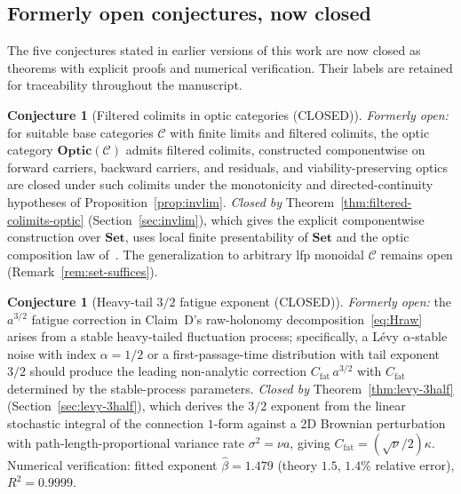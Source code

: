\documentclass[11pt,a4paper]{article}
\theoremstyle{plain}
\theoremstyle{definition}
\newtheorem{conjecture}[theorem]{Conjecture}
\theoremstyle{remark}
\newcommand{\CC}{\mathcal{C}}
\newcommand{\Optic}{\mathbf{Optic}}
\begin{document}
\subsection{Formerly open conjectures, now closed}

The five conjectures stated in earlier versions of this work are now
closed as theorems with explicit proofs and numerical verification.
Their labels are retained for traceability throughout the manuscript.

\begin{conjecture}[Filtered colimits in optic categories (CLOSED)]
\label{conj:filtered-colimits-optic}
\emph{Formerly open:} for suitable base categories $\CC$ with finite
limits and filtered colimits, the optic category $\Optic(\CC)$ admits
filtered colimits, constructed componentwise on forward carriers,
backward carriers, and residuals, and viability-preserving optics are
closed under such colimits under the monotonicity and directed-continuity
hypotheses of Proposition~\ref{prop:invlim}. \emph{Closed by}
Theorem~\ref{thm:filtered-colimits-optic} (Section~\ref{sec:invlim}),
which gives the explicit componentwise construction over $\mathbf{Set}$,
uses local finite presentability of $\mathbf{Set}$ and the optic
composition law of~\cite{riley2018optics}. The generalization to
arbitrary lfp monoidal $\CC$ remains open
(Remark~\ref{rem:set-suffices}).
\end{conjecture}

\begin{conjecture}[Heavy-tail $3/2$ fatigue exponent (CLOSED)]
\label{conj:heavytail-3half}
\emph{Formerly open:} the $a^{3/2}$ fatigue correction in Claim~D's
raw-holonomy decomposition~\eqref{eq:Hraw} arises from a stable
heavy-tailed fluctuation process; specifically, a L\'evy $\alpha$-stable
noise with index $\alpha=1/2$ or a first-passage-time distribution with
tail exponent $3/2$ should produce the leading non-analytic correction
$C_{\mathrm{fat}}\,a^{3/2}$ with $C_{\mathrm{fat}}$ determined by the
stable-process parameters. \emph{Closed by}
Theorem~\ref{thm:levy-3half} (Section~\ref{sec:levy-3half}), which
derives the $3/2$ exponent from the linear stochastic integral of the
connection $1$-form against a 2D Brownian perturbation with
path-length-proportional variance rate $\sigma^{2}=\nu a$, giving
$C_{\mathrm{fat}}=(\sqrt{\nu}/2)\kappa$. Numerical verification: fitted
exponent $\widehat\beta=1.479$ (theory $1.5$, $1.4\%$ relative error),
$R^{2}=0.9999$.
\end{conjecture}
\end{document}
